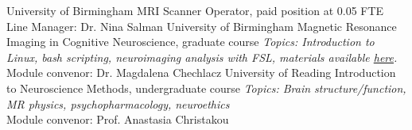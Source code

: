 {University of Birmingham}
{MRI Scanner Operator, \footnotesize paid position at 0.05 FTE}
{\footnotesize Line Manager: Dr. Nina Salman}
\vspace{0.7em}
{University of Birmingham}
{Magnetic Resonance Imaging in Cognitive Neuroscience, \footnotesize graduate course}
{\emph{\footnotesize Topics: Introduction to Linux, bash scripting, neuroimaging analysis with FSL, materials available \href{https://sohaamir.github.io/MRICN/}{here}.}}\\
{\footnotesize Module convenor: Dr. Magdalena Chechlacz}
\vspace{0.7em}
{University of Reading}
{Introduction to Neuroscience Methods, \footnotesize undergraduate course}
{\emph{\footnotesize Topics: Brain structure/function, MR physics, psychopharmacology, neuroethics}}\\
{\footnotesize Module convenor: Prof. Anastasia Christakou}